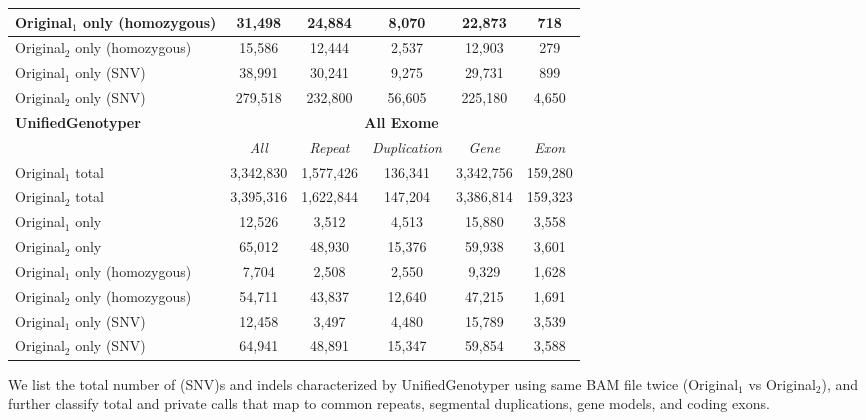 \begin{table}[htb]
\begin{center}
\begin{tabular}{|l|c||c|c|c|c|}
\hline
Original$_1$ only (homozygous) & 31,498 & 24,884 & 8,070 & 22,873 & 718 \\
\hline
Original$_2$ only (homozygous) & 15,586 & 12,444 & 2,537 & 12,903 & 279 \\
\hline
Original$_1$ only (SNV) & 38,991 & 30,241 & 9,275 & 29,731 & 899 \\
\hline
Original$_2$ only (SNV) & 279,518 & 232,800 & 56,605 & 225,180 & 4,650 \\
\hline
\hline
{\bf UnifiedGenotyper} & \multicolumn{5}{|c|}{\bf All Exome} \\
\hline
\cline{2-6}
{\bf} & {\it All} & {\it Repeat} & {\it Duplication} & {\it Gene} & {\it Exon} \\
\hline
Original$_1$ total & 3,342,830 & 1,577,426 & 136,341 & 3,342,756 & 159,280 \\
\hline
Original$_2$ total & 3,395,316 & 1,622,844 & 147,204 & 3,386,814 & 159,323 \\
\hline
Original$_1$ only & 12,526 & 3,512 & 4,513 & 15,880 & 3,558 \\
\hline
Original$_2$ only & 65,012 & 48,930 & 15,376 & 59,938 & 3,601 \\
\hline
Original$_1$ only (homozygous) & 7,704 & 2,508 & 2,550 & 9,329 & 1,628 \\
\hline
Original$_2$ only (homozygous) & 54,711 & 43,837 & 12,640 & 47,215 & 1,691 \\
\hline
Original$_1$ only (SNV) & 12,458 & 3,497 & 4,480 & 15,789 & 3,539 \\
\hline
Original$_2$ only (SNV) & 64,941 & 48,891 & 15,347 & 59,854 & 3,588 \\
\hline
\end{tabular}
\end{center}
{\footnotesize We list the total number of (SNV)s and indels characterized by UnifiedGenotyper using same BAM file twice (Original$_1$ vs Original$_2$), 
and further classify total and private calls that map to common repeats, segmental duplications, gene models, and coding exons.}
\label{supptab:orig-vs-orig2-ug}
\end{table}

